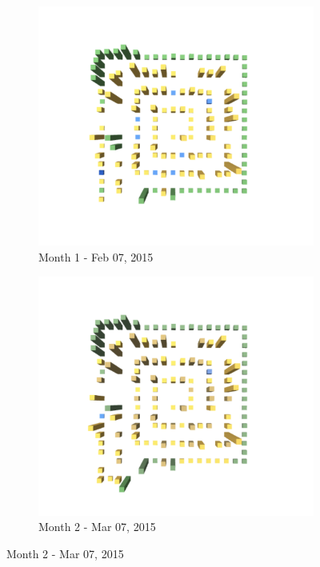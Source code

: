 \begin{figure}[ht]
    \begin{subfigure}{0.48\textwidth}
    \includegraphics[width=\linewidth]{JetUML_V1S1.png}
    \caption{Month 1 - Feb 07, 2015 } \label{fig:JetUML_V1S1}
    \end{subfigure}\hspace*{\fill}
    \begin{subfigure}{0.48\textwidth}
        \includegraphics[width=\linewidth]{JetUML_V1S2.png}
        \caption{Month 2 - Mar 07, 2015} \label{fig:JetUML_V1S2}
    \end{subfigure}
    

\end{figure}
